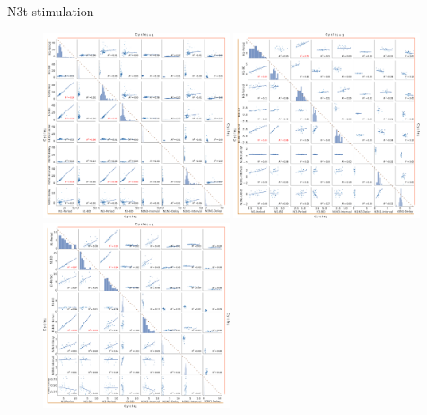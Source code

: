 \documentclass[aspectratio=43]{beamer}
\begin{document}
\begin{frame}{N3t stimulation}
\begin{figure}[hbt!]
\begin{minipage}[b]{0.44\textwidth}
\begin{minipage}[b]{\textwidth}
			\end{minipage}
		\end{minipage}
	\end{figure}
	
\end{frame}

\begin{frame}
	
	\begin{figure}[htbp]
		\centering
		\includegraphics[width=0.49\textwidth]{./invariants/data/SUSSEX/prep2/images/2phases/output_pairplot_reset_triangle.png}
		\includegraphics[width=0.49\textwidth]{./invariants/data/SUSSEX/SO_driven/images/output_pairplot_reset_triangle.png}
		\\
		\vspace{10pt}
		\includegraphics[width=0.49\textwidth]{./invariants/data/SUSSEX/MLN_driven/images/output_pairplot_reset_triangle.png}

\end{figure}
\end{frame}
\end{document}
